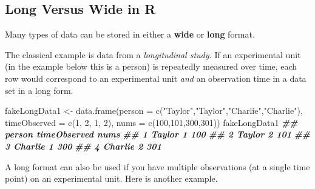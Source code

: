 \documentclass[
  12pt,
  krantz2]{krantz}
\makeatletter
\newenvironment{Shaded}{\begin{snugshade}}{\end{snugshade}}
\newcommand{\AttributeTok}[1]{\textcolor[rgb]{0.61,0.61,0.61}{#1}}
\newcommand{\DecValTok}[1]{\textcolor[rgb]{0.06,0.06,0.06}{#1}}
\newcommand{\DocumentationTok}[1]{\textcolor[rgb]{0.37,0.37,0.37}{\textbf{\textit{#1}}}}
\newcommand{\FunctionTok}[1]{\textcolor[rgb]{0,0,0}{#1}}
\newcommand{\NormalTok}[1]{#1}
\newcommand{\OtherTok}[1]{\textcolor[rgb]{0.37,0.37,0.37}{#1}}
\newcommand{\StringTok}[1]{\textcolor[rgb]{0.5,0.5,0.5}{#1}}
\newenvironment{kframe}{%
\medskip{}
\setlength{\fboxsep}{.8em}
 \def\at@end@of@kframe{}%
 \ifinner\ifhmode%
  \def\at@end@of@kframe{\end{minipage}}%
  \begin{minipage}{\columnwidth}%
 \fi\fi%
 \def\FrameCommand##1{\hskip\@totalleftmargin \hskip-\fboxsep
 \colorbox{shadecolor}{##1}\hskip-\fboxsep
     \hskip-\linewidth \hskip-\@totalleftmargin \hskip\columnwidth}%
 \MakeFramed {\advance\hsize-\width
   \@totalleftmargin\z@ \linewidth\hsize
   \@setminipage}}%
 {\par\unskip\endMakeFramed%
 \at@end@of@kframe}
\renewenvironment{Shaded}{\begin{kframe}}{\end{kframe}}
\makeatother
\begin{document}
\hypertarget{long-versus-wide-in-r}{%
\subsection{Long Versus Wide in R}\label{long-versus-wide-in-r}}

Many types of data can be stored in either a \textbf{wide} or \textbf{long} format.

The classical example is data from a \emph{longitudinal study.} If an experimental unit (in the example below this is a person) is repeatedly measured over time, each row would correspond to an experimental unit \emph{and} an observation time in a data set in a long form.

\begin{Shaded}
\begin{Highlighting}[]
\NormalTok{fakeLongData1 }\OtherTok{\textless{}{-}} \FunctionTok{data.frame}\NormalTok{(}\AttributeTok{person =} \FunctionTok{c}\NormalTok{(}\StringTok{"Taylor"}\NormalTok{,}\StringTok{"Taylor"}\NormalTok{,}\StringTok{"Charlie"}\NormalTok{,}\StringTok{"Charlie"}\NormalTok{), }
                             \AttributeTok{timeObserved =} \FunctionTok{c}\NormalTok{(}\DecValTok{1}\NormalTok{, }\DecValTok{2}\NormalTok{, }\DecValTok{1}\NormalTok{, }\DecValTok{2}\NormalTok{),}
                             \AttributeTok{nums =} \FunctionTok{c}\NormalTok{(}\DecValTok{100}\NormalTok{,}\DecValTok{101}\NormalTok{,}\DecValTok{300}\NormalTok{,}\DecValTok{301}\NormalTok{))}
\NormalTok{fakeLongData1}
\DocumentationTok{\#\#    person timeObserved nums}
\DocumentationTok{\#\# 1  Taylor            1  100}
\DocumentationTok{\#\# 2  Taylor            2  101}
\DocumentationTok{\#\# 3 Charlie            1  300}
\DocumentationTok{\#\# 4 Charlie            2  301}
\end{Highlighting}
\end{Shaded}

A long format can also be used if you have multiple observations (at a single time point) on an experimental unit. Here is another example.
\end{document}

